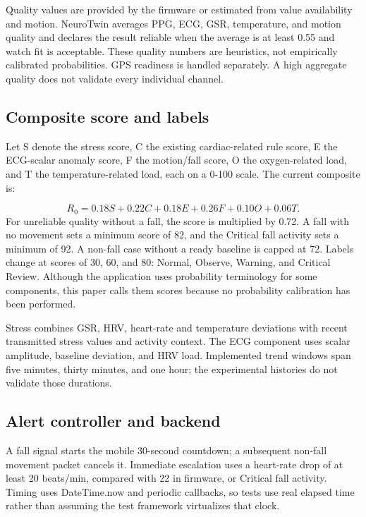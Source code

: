 \documentclass[journal]{IEEEtran}
\begin{document}
Quality values are provided by the firmware or estimated from value availability and motion. NeuroTwin averages PPG, ECG, GSR, temperature, and motion quality and declares the result reliable when the average is at least 0.55 and watch fit is acceptable. These quality numbers are heuristics, not empirically calibrated probabilities. GPS readiness is handled separately. A high aggregate quality does not validate every individual channel.

\subsection{Composite score and labels}
Let S denote the stress score, C the existing cardiac-related rule score, E the ECG-scalar anomaly score, F the motion/fall score, O the oxygen-related load, and T the temperature-related load, each on a 0-100 scale. The current composite is:

\begin{equation}R_0=0.18S+0.22C+0.18E+0.26F+0.10O+0.06T.\end{equation}
For unreliable quality without a fall, the score is multiplied by 0.72. A fall with no movement sets a minimum score of 82, and the Critical fall activity sets a minimum of 92. A non-fall case without a ready baseline is capped at 72. Labels change at scores of 30, 60, and 80: Normal, Observe, Warning, and Critical Review. Although the application uses probability terminology for some components, this paper calls them scores because no probability calibration has been performed.

Stress combines GSR, HRV, heart-rate and temperature deviations with recent transmitted stress values and activity context. The ECG component uses scalar amplitude, baseline deviation, and HRV load. Implemented trend windows span five minutes, thirty minutes, and one hour; the experimental histories do not validate those durations.

\subsection{Alert controller and backend}
A fall signal starts the mobile 30-second countdown; a subsequent non-fall movement packet cancels it. Immediate escalation uses a heart-rate drop of at least 20 beats/min, compared with 22 in firmware, or Critical fall activity. Timing uses DateTime.now and periodic callbacks, so tests use real elapsed time rather than assuming the test framework virtualizes that clock.
\end{document}
